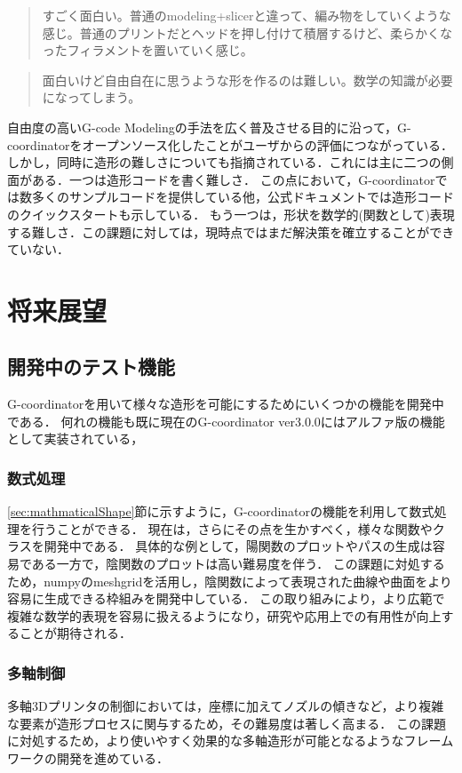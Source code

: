 \documentclass{article}
\begin{document}
\begin{twocolumn}
\begin{itemize}
\begin{quote}
  すごく面白い。普通のmodeling+slicerと違って、編み物をしていくような感じ。普通のプリントだとヘッドを押し付けて積層するけど、柔らかくなったフィラメントを置いていく感じ。
\end{quote}

\begin{quote}
  面白いけど自由自在に思うような形を作るのは難しい。数学の知識が必要になってしまう。
\end{quote}

自由度の高いG-code Modelingの手法を広く普及させる目的に沿って，G-coordinatorをオープンソース化したことがユーザからの評価につながっている．
しかし，同時に造形の難しさについても指摘されている．これには主に二つの側面がある．一つは造形コードを書く難しさ．
この点において，G-coordinatorでは数多くのサンプルコードを提供している他，公式ドキュメントでは造形コードのクイックスタートも示している．
もう一つは，形状を数学的(関数として)表現する難しさ．この課題に対しては，現時点ではまだ解決策を確立することができていない．

\section{将来展望}
\subsection{開発中のテスト機能}
G-coordinatorを用いて様々な造形を可能にするためにいくつかの機能を開発中である．
何れの機能も既に現在のG-coordinator ver3.0.0にはアルファ版の機能として実装されている，
\subsubsection{数式処理}
\ref{sec:mathmaticalShape}節に示すように，G-coordinatorの機能を利用して数式処理を行うことができる．
現在は，さらにその点を生かすべく，様々な関数やクラスを開発中である．
具体的な例として，陽関数のプロットやパスの生成は容易である一方で，陰関数のプロットは高い難易度を伴う．
この課題に対処するため，numpyのmeshgridを活用し，陰関数によって表現された曲線や曲面をより容易に生成できる枠組みを開発中している．
この取り組みにより，より広範で複雑な数学的表現を容易に扱えるようになり，研究や応用上での有用性が向上することが期待される．

\subsubsection{多軸制御}
多軸3Dプリンタの制御においては，座標に加えてノズルの傾きなど，より複雑な要素が造形プロセスに関与するため，その難易度は著しく高まる．
この課題に対処するため，より使いやすく効果的な多軸造形が可能となるようなフレームワークの開発を進めている．


\end{itemize}
\end{twocolumn}
\end{document}
